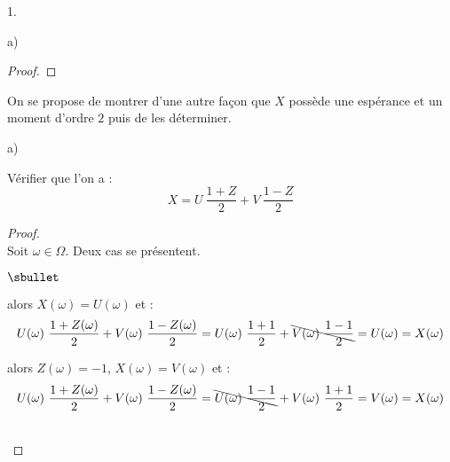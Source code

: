 \begin{noliste}{1.}
\begin{noliste}{a)}
\begin{proof}
    \end{proof}    
  \end{noliste}


  
\item On se propose de montrer d'une autre façon que $X$ possède une
  espérance et un moment d'ordre $2$ puis de les déterminer.

  \begin{noliste}{a)}
    \setlength{\itemsep}{2mm}
  \item Vérifier que l'on a :
    \[
    X = U \ \dfrac{1 + Z}{2} + V \ \dfrac{1-Z}{2}
    \]    

    \begin{proof}~\\
      Soit $\omega \in \Omega$. Deux cas se présentent.
      \begin{noliste}{$\sbullet$}
      \item {} alors $X(\omega) =
        U(\omega)$ et :
        \[
        U(\omega) \ \dfrac{1+Z(\omega)}{2} + V(\omega) \
        \dfrac{1-Z(\omega)}{2} = U(\omega) \ \dfrac{1+1}{2} +
        \bcancel{V(\omega) \ \dfrac{1-1}{2}} = U(\omega) = X(\omega)
        \]
      \item {} alors $Z(\omega) = -1$,
        $X(\omega) = V(\omega)$ et :
        \[
        U(\omega) \ \dfrac{1+Z(\omega)}{2} + V(\omega) \
        \dfrac{1-Z(\omega)}{2} = \bcancel{U(\omega) \ \dfrac{1-1}{2}}
        + V(\omega) \ \dfrac{1+1}{2} = V(\omega) = X(\omega)
        \]    
      \end{noliste}
      ~\\[-1cm]
    \end{proof}



\end{noliste}
\end{noliste}
